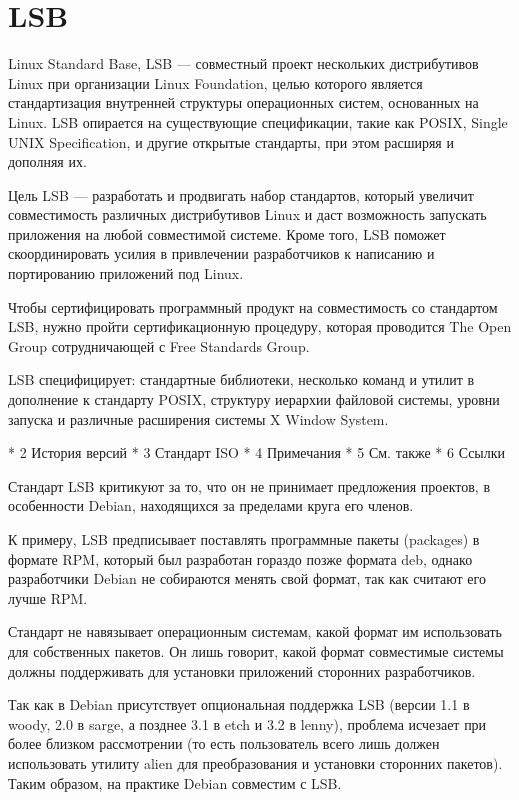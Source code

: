 \section{LSB}
Linux Standard Base, LSB — совместный проект нескольких дистрибутивов Linux при организации Linux Foundation, целью которого является стандартизация внутренней структуры операционных систем, основанных на Linux. LSB опирается на существующие спецификации, такие как POSIX, Single UNIX Specification, и другие открытые стандарты, при этом расширяя и дополняя их.

    Цель LSB — разработать и продвигать набор стандартов, который увеличит совместимость различных дистрибутивов Linux и даст возможность запускать приложения на любой совместимой системе. Кроме того, LSB поможет скоординировать усилия в привлечении разработчиков к написанию и портированию приложений под Linux.

Чтобы сертифицировать программный продукт на совместимость со стандартом LSB, нужно пройти сертификационную процедуру, которая проводится The Open Group сотрудничающей с Free Standards Group.

LSB специфицирует: стандартные библиотеки, несколько команд и утилит в дополнение к стандарту POSIX, структуру иерархии файловой системы, уровни запуска и различные расширения системы X Window System.

    * 2 История версий
    * 3 Стандарт ISO
    * 4 Примечания
    * 5 См. также
    * 6 Ссылки

Стандарт LSB критикуют за то, что он не принимает предложения проектов, в особенности Debian, находящихся за пределами круга его членов.

К примеру, LSB предписывает поставлять программные пакеты (packages) в формате RPM, который был разработан гораздо позже формата deb, однако разработчики Debian не собираются менять свой формат, так как считают его лучше RPM.

Стандарт не навязывает операционным системам, какой формат им использовать для собственных пакетов. Он лишь говорит, какой формат совместимые системы должны поддерживать для установки приложений сторонних разработчиков.

Так как в Debian присутствует опциональная поддержка LSB (версии 1.1 в woody, 2.0 в sarge, а позднее 3.1 в etch и 3.2 в lenny), проблема исчезает при более близком рассмотрении (то есть пользователь всего лишь должен использовать утилиту alien для преобразования и установки сторонних пакетов). Таким образом, на практике Debian совместим с LSB.

